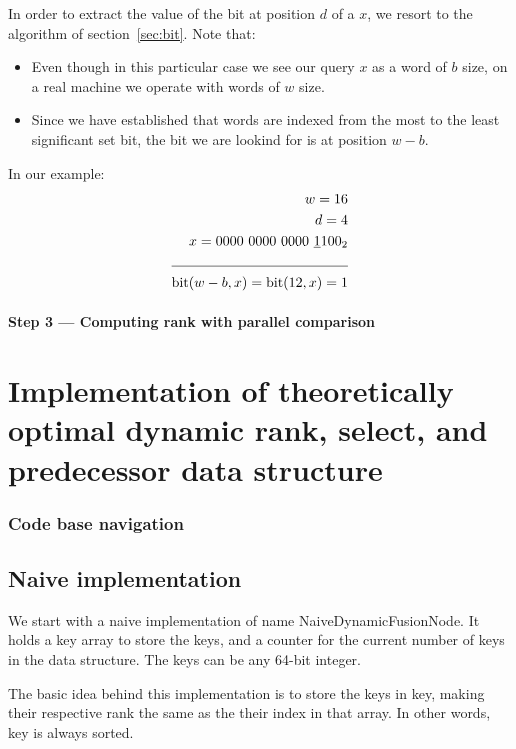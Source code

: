 In order to extract the value of the bit at position $d$ of a $x$, we resort to the algorithm of section~\ref{sec:bit}. Note that:
\begin{itemize}
    \item
    Even though in this particular case we see our query $x$ as a word of $b$ size, on a real machine we operate with words of $w$ size.
    \item
    Since we have established that words are indexed from the most to the least significant set bit, the bit we are lookind for is at position $w - b$.
\end{itemize}

In our example:
\begin{align*}
    w = 16 &\\
    d = 4 &\\
    x = 0000\ 0000\ 0000\ \underline{1}100_2 &\\
    \cline{1-2}
    \text{bit}(w - b, x) = \text{bit}(12, x) = 1 &\\
\end{align*}

\subsubsection{Step 3 --- Computing rank with parallel comparison}



\chapter{Implementation of theoretically optimal dynamic rank, select, and predecessor data structure}

\subsection{Code base navigation}

\section{Naive implementation}
We start with a naive implementation of name {\ttfamily NaiveDynamicFusionNode}. It holds a {\ttfamily key} array to store the keys, and a counter for the current number of keys in the data structure. The keys can be any 64-bit integer.

The basic idea behind this implementation is to store the keys in {\ttfamily key}, making their respective rank the same as the their index in that array. In other words, {\ttfamily key} is always sorted.

